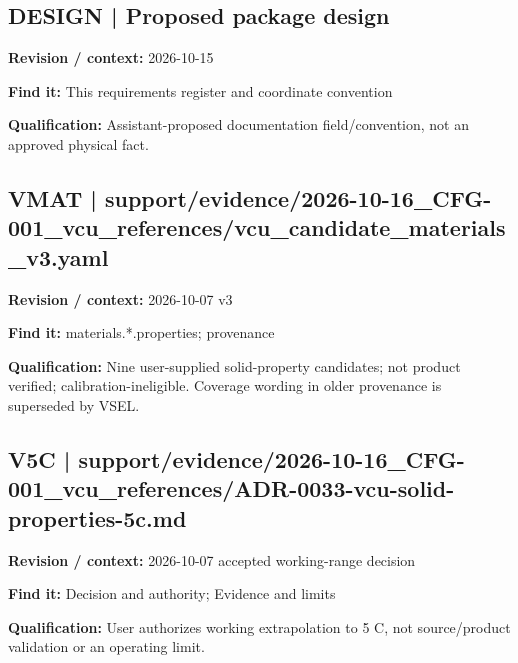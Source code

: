 \documentclass[11pt]{article}
\begin{document}
\par
\par\noindent\begin{minipage}{\textwidth}\small
\subsection*{DESIGN | Proposed package design}
\textbf{Revision / context:} 2026-10-15\par
\textbf{Find it:} This requirements register and coordinate convention\par
\textbf{Qualification:} Assistant-proposed documentation field/convention, not an approved physical fact.\par
\end{minipage}\par\vspace{5pt}
\par\noindent\begin{minipage}{\textwidth}\small
\subsection*{VMAT | support/evidence/2026-10-16\_\allowbreak{}CFG-001\_\allowbreak{}vcu\_\allowbreak{}references/vcu\_\allowbreak{}candidate\_\allowbreak{}materials\_\allowbreak{}v3.yaml}
\textbf{Revision / context:} 2026-10-07 v3\par
\textbf{Find it:} materials.*.properties; provenance\par
\textbf{Qualification:} Nine user-supplied solid-property candidates; not product verified; calibration-ineligible. Coverage wording in older provenance is superseded by VSEL.\par
\end{minipage}\par\vspace{5pt}
\par\noindent\begin{minipage}{\textwidth}\small
\subsection*{V5C | support/evidence/2026-10-16\_\allowbreak{}CFG-001\_\allowbreak{}vcu\_\allowbreak{}references/ADR-0033-vcu-solid-properties-5c.md}
\textbf{Revision / context:} 2026-10-07 accepted working-range decision\par
\textbf{Find it:} Decision and authority; Evidence and limits\par
\textbf{Qualification:} User authorizes working extrapolation to 5 C, not source/product validation or an operating limit.\par
\end{minipage}\par\vspace{5pt}
\end{document}
